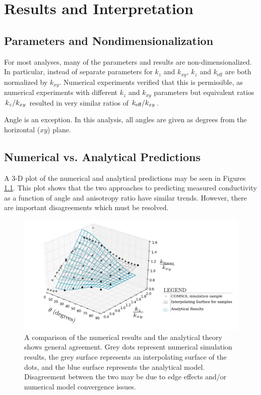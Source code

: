 \chapter{Results and Interpretation}

\section{Parameters and Nondimensionalization}

For most analyses, many of the parameters and results are non-dimensionalized. In
particular, instead of separate parameters for \(k_z\) and \(k_{xy}\), \(k_z\)
and \(k_{\textrm{eff}}\) are both normalized by \(k_{xy}\). Numerical
experiments verified that this is permissible, as numerical experiments with
different \(k_z\) and \(k_{xy}\) parameters but equivalent ratios
\(\left.{k_z}\middle/{k_{xy}}\right.\) resulted in very similar ratios of
\(\left.{k_{\textrm{eff}}}\middle/{k_{xy}}\right.\).

Angle is an exception. In this analysis, all angles are given as degrees from
the horizontal (\(xy\)) plane.

\section{Numerical vs. Analytical Predictions}

A 3-D plot of the numerical and analytical predictions may be seen in 
Figures \ref{fig:numvanal}. This plot shows that the two approaches to predicting measured conductivity
as a function of angle and anisotropy ratio have similar trends. However,
there are important disagreements which must be resolved.

\begin{figure}[h]
\centering
\includegraphics[width=\textwidth]{fig/numvanal.png}
\caption{A comparison of the numerical results and the analytical theory shows
general agreement. Grey dots represent numerical simulation results, the grey surface represents an interpolating surface of the dots, and the blue surface represents the analytical model. Disagreement between the two may be due to edge effects and/or numerical
model convergence issues.}
\label{fig:numvanal}
\end{figure}

